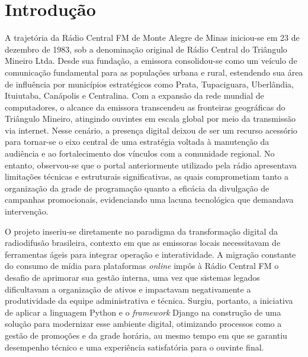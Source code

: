 \documentclass[12pt, openright, oneside, a4paper, brazil]{ads-unipac-abntex2}
\begin{document}
\cleardoublepage

\textual

\chapter[Introdução]{Introdução}
A trajetória da Rádio Central FM de Monte Alegre de Minas iniciou-se em 23 de dezembro de 1983, sob a denominação original de Rádio Central do Triângulo Mineiro Ltda. Desde sua fundação, a emissora consolidou-se como um veículo de comunicação fundamental para as populações urbana e rural, estendendo sua área de influência por municípios estratégicos como Prata, Tupaciguara, Uberlândia, Ituiutaba, Canápolis e Centralina. Com a expansão da rede mundial de computadores, o alcance da emissora transcendeu as fronteiras geográficas do Triângulo Mineiro, atingindo ouvintes em escala global por meio da transmissão via internet. Nesse cenário, a presença digital deixou de ser um recurso acessório para tornar-se o eixo central de uma estratégia voltada à manutenção da audiência e ao fortalecimento dos vínculos com a comunidade regional. No entanto, observou-se que o portal anteriormente utilizado pela rádio apresentava limitações técnicas e estruturais significativas, as quais comprometiam tanto a organização da grade de programação quanto a eficácia da divulgação de campanhas promocionais, evidenciando uma lacuna tecnológica que demandava intervenção.

O projeto inseriu-se diretamente no paradigma da transformação digital da radiodifusão brasileira, contexto em que as emissoras locais necessitavam de ferramentas ágeis para integrar operação e interatividade. A migração constante do consumo de mídia para plataformas \textit{online} impôs à Rádio Central FM o desafio de aprimorar sua gestão interna, uma vez que sistemas legados dificultavam a organização de ativos e impactavam negativamente a produtividade da equipe administrativa e técnica. Surgiu, portanto, a iniciativa de aplicar a linguagem Python e o \textit{framework} Django na construção de uma solução para modernizar esse ambiente digital, otimizando processos como a gestão de promoções e da grade horária, au mesmo tempo em que se garantiu desempenho técnico e uma experiência satisfatória para o ouvinte final.
\end{document}
